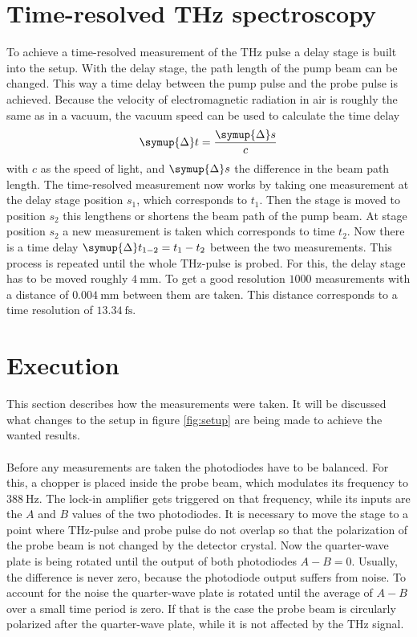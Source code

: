 \section{Time-resolved THz spectroscopy}
\label{sec:time_domain}
To achieve a time-resolved measurement of the $\si{\tera\hertz}$ pulse a delay stage is built into the setup.
With the delay stage, the path length of the pump beam can be changed.
This way a time delay between the pump pulse and the probe pulse is achieved.
Because the velocity of electromagnetic radiation in air is roughly the same as in a vacuum, the vacuum speed can be used to calculate the time delay   
\begin{equation}
    \symup{\Delta} t = \frac{\symup{\Delta} s}{c}
\end{equation}
with $c$ as the speed of light, and $\symup{\Delta} s$ the difference in the beam path length.
The time-resolved measurement now works by taking one measurement at the delay stage position $s_1$, which corresponds to $t_1$.
Then the stage is moved to position $s_2$ this lengthens or shortens the beam path of the pump beam.
At stage position $s_2$ a new measurement is taken which corresponds to time $t_2$.
Now there is a time delay $\symup{\Delta} t_{1-2} = t_1 - t_2$ between the two measurements.
This process is repeated until the whole $\si{\tera\hertz}$-pulse is probed.
For this, the delay stage has to be moved roughly $\SI{4}{\milli\meter}$.
To get a good resolution $1000$ measurements with a distance of $\SI{0.004}{\milli\meter}$ between them are taken.
This distance corresponds to a time resolution of $\SI{13.34}{\femto\second}$.


\section{Execution}
\label{sec:execution}
This section describes how the measurements were taken. 
It will be discussed what changes to the setup in figure \ref{fig:setup} are being made to achieve the wanted results.
\\\\
Before any measurements are taken the photodiodes have to be balanced.
For this, a chopper is placed inside the probe beam, which modulates its frequency to $\SI{388}{\hertz}$.
The lock-in amplifier gets triggered on that frequency, while its inputs are the $A$ and $B$ values of the two photodiodes.
It is necessary to move the stage to a point where $\si{\tera\hertz}$-pulse and probe pulse do not overlap so that the polarization of the probe beam is not changed by the detector crystal.
Now the quarter-wave plate is being rotated until the output of both photodiodes $A-B = 0$.
Usually, the difference is never zero, because the photodiode output suffers from noise.
To account for the noise the quarter-wave plate is rotated until the average of $A-B$ over a small time period is zero.
If that is the case the probe beam is circularly polarized after the quarter-wave plate, while it is not affected by the $\si{\tera\hertz}$ signal.
